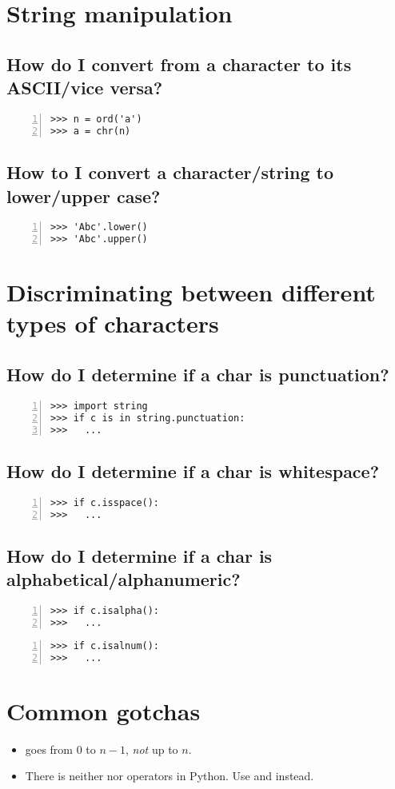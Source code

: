 \documentclass[12pt]{article}
\begin{document}
\section{String manipulation}
\subsection{How do I convert from a character to its ASCII/vice versa?}
\begin{lstlisting}[numbers=left]
>>> n = ord('a')
>>> a = chr(n)
\end{lstlisting}

\subsection{How to I convert a character/string to lower/upper case?}
\begin{lstlisting}[numbers=left]
>>> 'Abc'.lower()
>>> 'Abc'.upper()
\end{lstlisting}

\section{Discriminating between different types of characters}
\subsection{How do I determine if a char is punctuation?}
\begin{lstlisting}[numbers=left]
>>> import string
>>> if c is in string.punctuation:
>>>   ...
\end{lstlisting}

\subsection{How do I determine if a char is whitespace?}
\begin{lstlisting}[numbers=left]
>>> if c.isspace():
>>>   ...
\end{lstlisting}

\subsection{How do I determine if a char is alphabetical/alphanumeric?}
\begin{lstlisting}[numbers=left]
>>> if c.isalpha():
>>>   ...
\end{lstlisting}
\begin{lstlisting}[numbers=left]
>>> if c.isalnum():
>>>   ...
\end{lstlisting}

\section{Common gotchas}
\begin{itemize}
\item {} goes from $0$ to $n-1$, \emph{not} up to $n$.
\item There is neither \python{++} nor \python{--} operators in Python. Use  and  instead.
\end{itemize}


%
%
\end{document}
